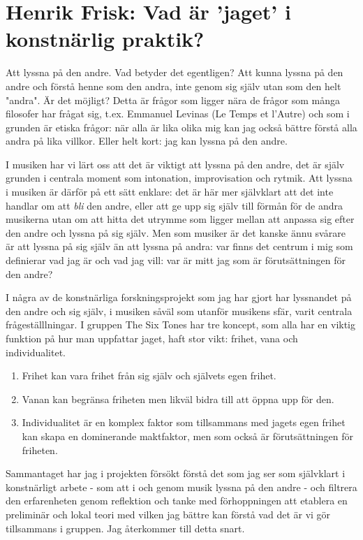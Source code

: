 \documentclass[11pt]{article}
\author{Henrik Frisk}
\date{\today}
\title{}
\begin{document}
\tableofcontents

\section{Henrik Frisk: Vad är 'jaget' i konstnärlig praktik?}
\label{sec:orgf4f6600}

Att lyssna på den andre. Vad betyder det egentligen? Att kunna lyssna på den andre och förstå henne som den andra, inte genom sig själv utan som den helt "andra". Är det möjligt? Detta är frågor som ligger nära de frågor som många filosofer har frågat sig, t.ex. Emmanuel Levinas (Le Temps et l'Autre) och som i grunden är etiska frågor: när alla är lika olika mig kan jag också bättre förstå alla andra på lika villkor. Eller helt kort: jag kan lyssna på den andre. 

I musiken har vi lärt oss att det är viktigt att lyssna på den andre, det är själv grunden i centrala moment som intonation, improvisation och rytmik. Att lyssna i musiken är därför på ett sätt enklare: det är här mer självklart att det inte handlar om att \emph{bli} den andre, eller att ge upp sig själv till förmån för de andra musikerna utan om att hitta det utrymme som ligger mellan att anpassa sig efter den andre och lyssna på sig själv. Men som musiker är det kanske ännu svårare är att lyssna på sig själv än att lyssna på andra: var finns det centrum i mig som definierar vad jag är och vad jag vill: var är mitt jag som är förutsättningen för den andre?

I några av de konstnärliga forskningsprojekt som jag har gjort har lyssnandet på den andre och sig själv, i musiken såväl som utanför musikens sfär, varit centrala frågeställlningar. I gruppen The Six Tones har tre koncept, som alla har en viktig funktion på hur man uppfattar jaget, haft stor vikt: frihet, vana och individualitet.

\begin{enumerate}
\item Frihet kan vara frihet från sig själv och självets egen frihet.
\item Vanan kan begränsa friheten men likväl bidra till att öppna upp för den.
\item Individualitet är en komplex faktor som tillsammans med jagets egen frihet kan skapa en dominerande maktfaktor, men som också är förutsättningen för friheten.
\end{enumerate}

Sammantaget har jag i projekten försökt förstå det som jag ser som självklart i konstnärligt arbete - som att i och genom musik lyssna på den andre - och filtrera den erfarenheten genom reflektion och tanke med förhoppningen att etablera en preliminär och lokal teori med vilken jag bättre kan förstå vad det är vi gör tillsammans i gruppen. Jag återkommer till detta snart.
\end{document}
